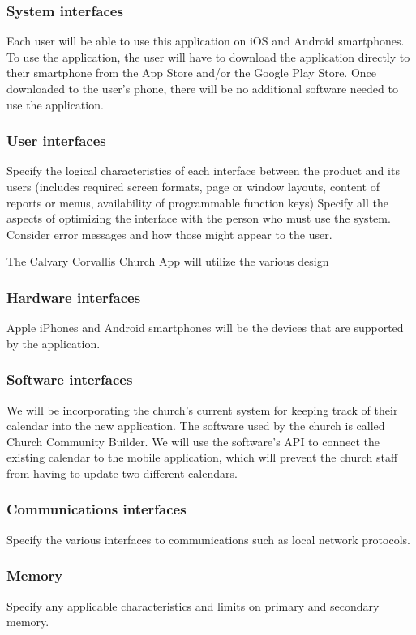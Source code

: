 \documentclass[letterpaper,10pt,draftclsnofoot,onecolumn,titlepage]{IEEEtran}
\begin{document}
	\subsubsection{System interfaces}
	Each user will be able to use this application on iOS and Android smartphones.
	To use the application, the user will have to download the application directly to their smartphone from the App Store and/or the Google Play Store.
	Once downloaded to the user's phone, there will be no additional software needed to use the application.

	\subsubsection{User interfaces}
	Specify the logical characteristics of each interface between the product and its users (includes required screen formats, page or window layouts, content of reports or menus, availability of programmable function keys)
	Specify all the aspects of optimizing the interface with the person who must use the system.
	Consider error messages and how those might appear to the user.

	The Calvary Corvallis Church App will utilize the various design

	\subsubsection{Hardware interfaces}
	Apple iPhones and Android smartphones will be the devices that are supported by the application.

	\subsubsection{Software interfaces}
	We will be incorporating the church's current system for keeping track of their calendar into the new application.
	The software used by the church is called Church Community Builder.
	We will use the software's API to connect the existing calendar to the mobile application, which will prevent the church staff from having to update two different calendars.

	\subsubsection{Communications interfaces}
	Specify the various interfaces to communications such as local network protocols.

	\subsubsection{Memory}
	Specify any applicable characteristics and limits on primary and secondary memory.
\end{document}
